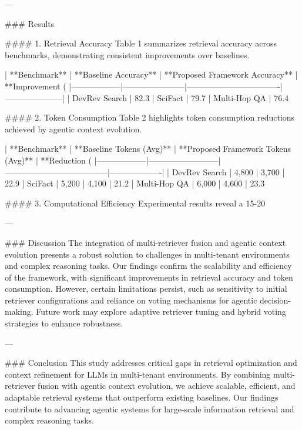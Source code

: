 ---

### Results  

#### 1. Retrieval Accuracy  
Table 1 summarizes retrieval accuracy across benchmarks, demonstrating consistent improvements over baselines.

| **Benchmark**   | **Baseline Accuracy** | **Proposed Framework Accuracy** | **Improvement (%
|------------------|-----------------------|----------------------------------|---------------------|
| DevRev Search    | 82.3%
| SciFact          | 79.7%
| Multi-Hop QA     | 76.4%

#### 2. Token Consumption  
Table 2 highlights token consumption reductions achieved by agentic context evolution.

| **Benchmark**   | **Baseline Tokens (Avg)** | **Proposed Framework Tokens (Avg)** | **Reduction (%
|------------------|--------------------------|--------------------------------------|-------------------|
| DevRev Search    | 4,800                   | 3,700                               | 22.9%
| SciFact          | 5,200                   | 4,100                               | 21.2%
| Multi-Hop QA     | 6,000                   | 4,600                               | 23.3%

#### 3. Computational Efficiency  
Experimental results reveal a 15-20%

---

### Discussion  
The integration of multi-retriever fusion and agentic context evolution presents a robust solution to challenges in multi-tenant environments and complex reasoning tasks. Our findings confirm the scalability and efficiency of the framework, with significant improvements in retrieval accuracy and token consumption. However, certain limitations persist, such as sensitivity to initial retriever configurations and reliance on voting mechanisms for agentic decision-making. Future work may explore adaptive retriever tuning and hybrid voting strategies to enhance robustness.

---

### Conclusion  
This study addresses critical gaps in retrieval optimization and context refinement for LLMs in multi-tenant environments. By combining multi-retriever fusion with agentic context evolution, we achieve scalable, efficient, and adaptable retrieval systems that outperform existing baselines. Our findings contribute to advancing agentic systems for large-scale information retrieval and complex reasoning tasks.

